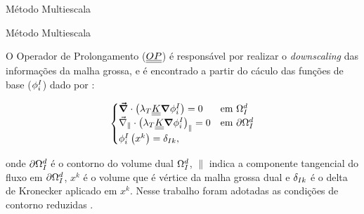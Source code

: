 \documentclass[professionalfont]{beamer}
\begin{document}
\begin{frame}{Método Multiescala}
    \begin{figure}[!ht]
        \begin{subfigure}{.48\textwidth}
            \centering
            \resizebox*{5.9cm}{!}{
            }
            \label{fig:multiescala.3.a}
        \end{subfigure}
        \begin{subfigure}{.48\textwidth}
            \centering
            \resizebox*{4.25cm}{!}{
            }
            \label{fig:multiescala.3.b}
        \end{subfigure}
        \label{fig:multiescala.3}
    \end{figure}
\end{frame}

\begin{frame}{Método Multiescala}
    
    \small 
    O Operador de Prolongamento ($\underline{\underline{OP}}$) é responsável por realizar o \textit{downscaling} das informações da malha grossa, e é encontrado a partir do cáculo das funções de base ($\phi^{I}_{i}$) dado por \cite{Zhou2012, Wang2014}:

    \begin{equation}
        \label{eq:multiescala.1}
        \begin{cases}
            \mbox{\boldmath$ \vec{\nabla} $} \cdot \left( \lambda_{T} \underline{\underline{K}} \mbox{\boldmath$ \nabla $} \phi^{I}_{i} \right) = 0 & \text{em } \Omega_{I}^{d}\\
            \vec{\nabla}_{\parallel} \cdot \left( \lambda_{T} \underline{\underline{K}} \mbox{\boldmath$ \nabla $} \phi^{I}_{i} \right)_{\parallel} = 0 & \text{em } \partial \Omega_{I}^{d}\\
            \phi^{I}_{i} \left( x^{k}\right) = \delta_{Ik},
        \end{cases}
    \end{equation}

    onde $\partial \Omega_{I}^{d}$ é o contorno do volume dual $\Omega_{I}^{d}$, $\parallel$ indica a componente tangencial do fluxo em $\partial \Omega_{I}^{d}$, $x^{k}$ é o volume que é vértice da malha grossa dual e $\delta_{Ik}$ é o delta de Kronecker aplicado em $x^{k}$. Nesse trabalho foram adotadas as condições de contorno reduzidas \cite{Arthur_diss,Mazlumi_2021}.
\end{frame}
\end{document}

